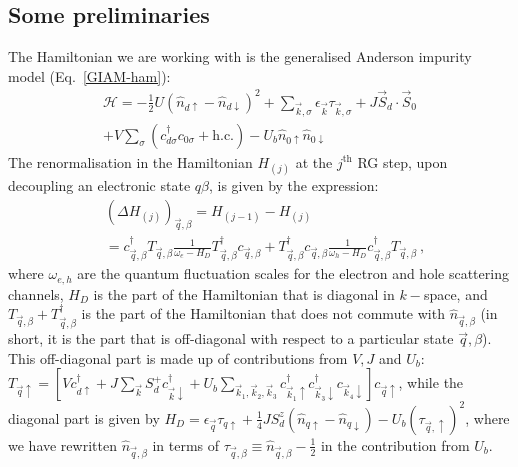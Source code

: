 \documentclass[reprint,superscriptaddress,floatfix]{revtex4-2}
\begin{document}
\subsection{Some preliminaries}
The Hamiltonian we are working with is the generalised Anderson impurity model (Eq.~\ref{GIAM-ham}):
\begin{equation}\begin{aligned}
	\mathcal{H} = -\frac{1}{2}U \left(\hat n_{d \uparrow} - \hat n_{d \downarrow}\right)^2 + \sum_{\vec k,\sigma} \epsilon_{\vec k} \tau_{\vec k,\sigma} + J \vec{S}_d\cdot\vec{S}_0 \\
	+ V\sum_\sigma \left( c^\dagger_{d\sigma}c_{0\sigma} + \text{h.c.}\right) - U_b \hat n_{0 \uparrow} \hat n_{0 \downarrow}
\end{aligned}\end{equation}
The renormalisation in the Hamiltonian \(H_{(j)}\) at the \(j^\text{th}\) RG step, upon decoupling an electronic state \(q\beta\), is given by the expression:
\begin{equation}\begin{aligned}
	&\left(\Delta H_{(j)}\right)_{\vec q,\beta} = H_{(j-1)} - H_{(j)} \\
	&= c^\dagger_{\vec q,\beta} T_{\vec q,\beta} \frac{1}{\omega_e - H_D} T^\dagger_{\vec q,\beta}c_{\vec q,\beta} + T^\dagger_{\vec q,\beta} c_{\vec q,\beta} \frac{1}{\omega_h - H_D} c^\dagger_{\vec q,\beta}T_{\vec q,\beta}~,
\end{aligned}\end{equation}
where \(\omega_{e,h}\) are the quantum fluctuation scales for the electron and hole scattering channels, \(H_D\) is the part of the Hamiltonian that is diagonal in \(k-\)space, and \(T_{\vec q,\beta} + T_{\vec q,\beta}^\dagger\) is the part of the Hamiltonian that does not commute with \(\hat n_{\vec q,\beta}\) (in short, it is the part that is off-diagonal with respect to a particular state \(\vec q,\beta\)). This off-diagonal part is made up of contributions from \(V,J\) and \(U_b\): \(T_{\vec q \uparrow} = \left[V c^\dagger_{d \uparrow}  + J \sum_{\vec k}S_d^+ c^\dagger_{\vec k \downarrow}  + U_b \sum_{\vec k_1,\vec k_2,\vec k_3}c^\dagger_{\vec k_1 \uparrow} c^\dagger_{\vec k_3 \downarrow} c_{\vec k_4 \downarrow}\right] c_{\vec q \uparrow}\),
while the diagonal part is given by \(H_D = \epsilon_{\vec q} \tau_{q\uparrow} + \frac{1}{4}J S_d^z\left(\hat n_{q \uparrow} - \hat n_{q \downarrow}\right) - U_b \left(\tau_{\vec q,\uparrow}\right)^2\),
where we have rewritten \(\hat n_{\vec q,\beta}\) in terms of \(\tau_{\vec q,\beta} \equiv \hat n_{\vec q,\beta} - \frac{1}{2}\) in the contribution from \(U_b\).
\end{document}
